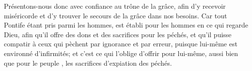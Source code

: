 Présentons-nous donc avec confiance au trône de la grâce, afin d’y recevoir miséricorde et d’y trouver le secours de la grâce dans nos besoins. Car tout Pontife étant pris parmi les hommes, est établi pour les hommes en ce qui regarde Dieu, afin qu’il offre des dons et des sacrifices pour les péchés, et qu’il puisse compatir à ceux qui pèchent par ignorance et par erreur, puisque lui-même est environné d’infirmités; et c’est ce qui l’oblige d’offrir pour lui-même, aussi bien que pour le peuple , les sacrifices d’expiation des péchés.